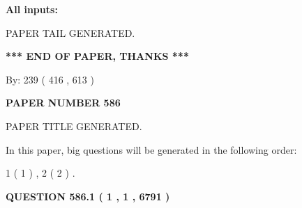 \documentclass[12pt]{article}
\begin{document}
   
   
   
\noindent{}
   
   
   
   
\noindent\vspace{0.1in}\hspace{-0.08in} {\textbf{\Large{All inputs: }}}
   
   
   
   
   
   
 \vspace{0.2in}
 
   
   
\vspace{2.0in} PAPER TAIL GENERATED.
   
   
   
   
\vspace{1.0in} 
{\textbf{\large{ *** END OF PAPER, THANKS *** }}} 
   
   
\hspace{1.0in} By: 
 239 ( 416 ,  613 )
   
   
   
   
\newpage 
\setcounter{page}{ 
   586001 } 
   
   
   
   
 {\textbf{ \Large{ PAPER NUMBER  586  }}}
   
   
\vspace{0.2in}
   
   
   
   
   
   
   
   
 \vspace{0.2in}
 
 
 
 
   
   
 PAPER TITLE GENERATED.
   
   
   
\vspace{0.2in}
   
In this paper, big questions will be generated in the following order: 
   
   
   1 ( 1 )
 ,
   2 ( 2 )
 .
  
\vspace{0.2in}
  
{\textbf{\Large{QUESTION
586.1 
 ( 1 , 1 , 6791 )
}}}
  
\end{document}
